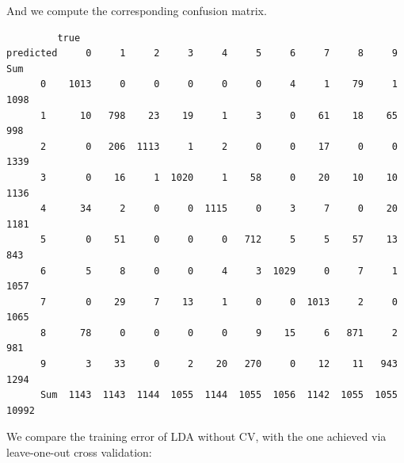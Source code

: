 \documentclass[
  letterpaper,
  DIV=11,
  numbers=noendperiod]{scrartcl}
\newenvironment{Shaded}{\begin{snugshade}}{\end{snugshade}}
\newcommand{\AttributeTok}[1]{\textcolor[rgb]{0.40,0.45,0.13}{#1}}
\newcommand{\DecValTok}[1]{\textcolor[rgb]{0.68,0.00,0.00}{#1}}
\newcommand{\FunctionTok}[1]{\textcolor[rgb]{0.28,0.35,0.67}{#1}}
\newcommand{\NormalTok}[1]{\textcolor[rgb]{0.00,0.23,0.31}{#1}}
\newcommand{\OtherTok}[1]{\textcolor[rgb]{0.00,0.23,0.31}{#1}}
\newcommand{\SpecialCharTok}[1]{\textcolor[rgb]{0.37,0.37,0.37}{#1}}
\newcommand{\StringTok}[1]{\textcolor[rgb]{0.13,0.47,0.30}{#1}}
\begin{document}
And we compute the corresponding confusion matrix.

\begin{Shaded}
\end{Shaded}

\begin{verbatim}
         true
predicted     0     1     2     3     4     5     6     7     8     9   Sum
      0    1013     0     0     0     0     0     4     1    79     1  1098
      1      10   798    23    19     1     3     0    61    18    65   998
      2       0   206  1113     1     2     0     0    17     0     0  1339
      3       0    16     1  1020     1    58     0    20    10    10  1136
      4      34     2     0     0  1115     0     3     7     0    20  1181
      5       0    51     0     0     0   712     5     5    57    13   843
      6       5     8     0     0     4     3  1029     0     7     1  1057
      7       0    29     7    13     1     0     0  1013     2     0  1065
      8      78     0     0     0     0     9    15     6   871     2   981
      9       3    33     0     2    20   270     0    12    11   943  1294
      Sum  1143  1143  1144  1055  1144  1055  1056  1142  1055  1055 10992
\end{verbatim}

We compare the training error of LDA without CV, with the one achieved
via leave-one-out cross validation:

\begin{Shaded}
\end{Shaded}
\end{document}
